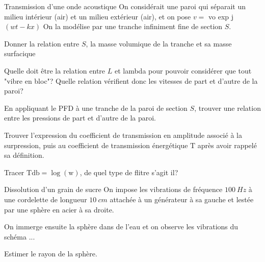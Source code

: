 \begin{exo}[PC][1][oral]{Transmission d’une onde acoustique}
  On considérait une paroi qui séparait un milieu intérieur (air) et un milieu extérieur (air), et on pose $v=$ vo exp j $(w t-k x)$
On la modélise par une tranche infiniment fine de section $S$.
\begin{quest}
\item Donner la relation entre $S$, la masse volumique de la tranche et sa masse surfacique
\item Quelle doit être la relation entre $L$ et lambda pour pouvoir considérer que tout "vibre en bloc"? Quelle relation vérifient donc les vitesses de part et d'autre de la paroi?
\item En appliquant le PFD à une tranche de la paroi de section $S$, trouver une relation entre les pressions de part et d'autre de la paroi.
\item Trouver l'expression du coefficient de transmission en amplitude associé à la surpression, puis au coefficient de transmission énergétique $\mathrm{T}$ après avoir rappelé sa définition.
\item Tracer $\mathrm{Tdb}=\log (\mathrm{w})$, de quel type de flitre s'agit il?
\end{quest}
\end{exo}

\begin{exo}[PC][1][oral]{Dissolution d’un grain de sucre}
  On impose les vibrations de fréquence $\SI{100}{Hz}$ à une cordelette de longueur $\SI{10}{cm}$ attachée à un générateur à sa gauche et lestée par une sphère en acier à sa droite.

  On immerge ensuite la sphère dans de l’eau et on observe les vibrations du schéma ...

  Estimer le rayon de la sphère.

\end{exo}
